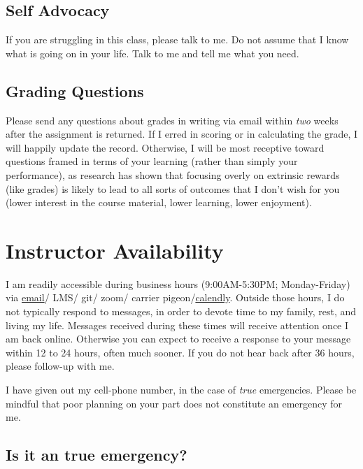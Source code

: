 \documentclass[
]{book}
\begin{document}
\hypertarget{self-advocacy-1}{%
\subsection{Self Advocacy}\label{self-advocacy-1}}

If you are struggling in this class, please talk to me. Do not assume that I know what is going on in your life. Talk to me and tell me what you need.

\hypertarget{grading-questions}{%
\subsection{Grading Questions}\label{grading-questions}}

Please send any questions about grades in writing via email within \emph{two} weeks after the assignment is returned. If I erred in scoring or in calculating the grade, I will happily update the record. Otherwise, I will be most receptive toward questions framed in terms of your learning (rather than simply your performance), as research has shown that focusing overly on extrinsic rewards (like grades) is likely to lead to all sorts of outcomes that I don't wish for you (lower interest in the course material, lower learning, lower enjoyment).

\hypertarget{instructor-availability}{%
\section{Instructor Availability}\label{instructor-availability}}

I am readily accessible during business hours (9:00AM-5:30PM; Monday-Friday) via \href{garrissm@wfu.edu}{email}/ LMS/ git/ zoom/ carrier pigeon/\href{https://calendly.com/smasongarrison/}{calendly}. Outside those hours, I do not typically respond to messages, in order to devote time to my family, rest, and living my life. Messages received during these times will receive attention once I am back online. Otherwise you can expect to receive a response to your message within 12 to 24 hours, often much sooner. If you do not hear back after 36 hours, please follow-up with me.

I have given out my cell-phone number, in the case of \emph{true} emergencies. Please be mindful that poor planning on your part does not constitute an emergency for me.

\hypertarget{is-it-an-true-emergency}{%
\subsection{Is it an true emergency?}\label{is-it-an-true-emergency}}
\end{document}
